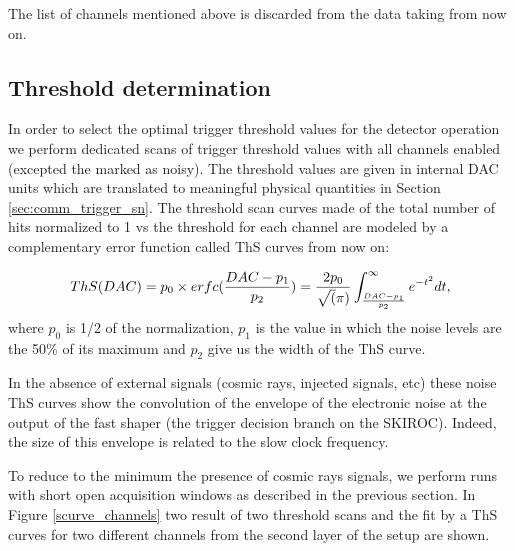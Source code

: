 \documentclass[final,3p,times,twocolumn]{elsarticle}
\begin{document}
The list of channels mentioned above is discarded from the data taking from now on.

\subsection{Threshold determination}
\label{sec:comm_trigger}

In order to select the optimal trigger threshold values for the detector operation
we perform dedicated scans of trigger threshold values
with all channels enabled (excepted the marked as noisy). 
The threshold values are given in internal DAC units which are translated to
meaningful physical quantities in Section \ref{sec:comm_trigger_sn}. 
The threshold scan curves made of the total number of hits normalized to 1 vs the threshold
for each channel are modeled by a complementary error function called ThS curves from now on:

\begin{equation}
ThS(DAC)=p_{0} \times erfc(\frac{DAC-p_{1}}{p_{2}}) = 
\newline
\frac{2p_{0}}{\sqrt(\pi)} \int_{\frac{DAC-p_{1}}{p_{2}}}^{\infty} e^{-t^{2}} dt,
\label{eq_S-curve}
\end{equation}
where $p_{0}$ is 1/2 of the normalization, $p_{1}$ is the value in which the noise levels are 
the 50\% of its maximum and $p_{2}$ give us the width of the ThS curve. 

In the absence of external signals (cosmic rays, injected signals, etc) 
these noise ThS curves show the convolution of the envelope of the 
electronic noise at the output of the fast shaper (the trigger decision branch on the SKIROC).
Indeed, the size of this envelope is related to the slow clock frequency.

To reduce to the minimum the presence of cosmic rays signals, 
we perform runs with short open acquisition windows
as described in the previous section.
In Figure \ref{scurve_channels} 
two result of two threshold scans and the fit by
a ThS curves for two different channels from the second layer of the setup are shown.
\end{document}
